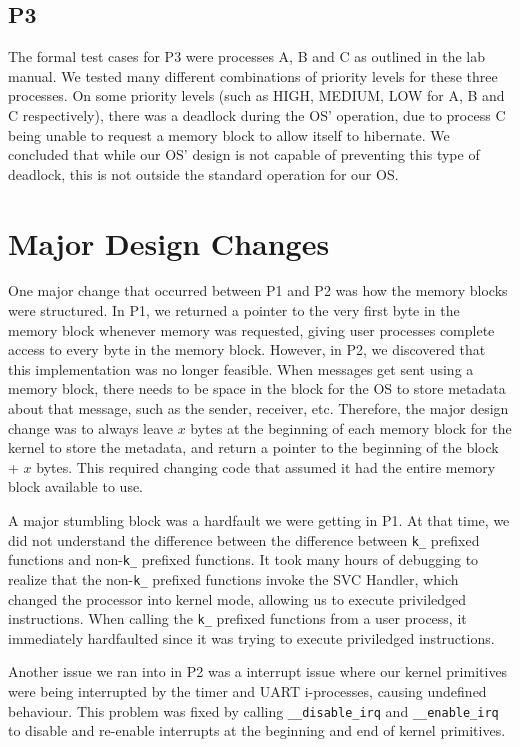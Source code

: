 \documentclass[12pt]{report}
\begin{document}
\subsection{P3}

The formal test cases for P3 were processes A, B and C as outlined in the lab manual.  We tested many different combinations of priority levels for these three processes.  On some priority levels (such as HIGH, MEDIUM, LOW for A, B and C respectively), there was a deadlock during the OS' operation, due to process C being unable to request a memory block to allow itself to hibernate.  We concluded that while our OS' design is not capable of preventing this type of deadlock, this is not outside the standard operation for our OS.

\section{Major Design Changes}

One major change that occurred between P1 and P2 was how the memory blocks were structured. In P1, we returned a pointer to the very first byte in the memory block whenever memory was requested, giving user processes complete access to every byte in the memory block. However, in P2, we discovered that this implementation was no longer feasible. When messages get sent using a memory block, there needs to be space in the block for the OS to store metadata about that message, such as the sender, receiver, etc. Therefore, the major design change was to always leave $x$ bytes at the beginning of each memory block for the kernel to store the metadata, and return a pointer to the beginning of the block + $x$ bytes. This required changing code that assumed it had the entire memory block available to use.

A major stumbling block was a hardfault we were getting in P1. At that time, we did not understand the difference between the difference between \texttt{k_} prefixed functions and non-\texttt{k_} prefixed functions. It took many hours of debugging to realize that the non-\texttt{k_} prefixed functions invoke the SVC Handler, which changed the processor into kernel mode, allowing us to execute priviledged instructions. When calling the \texttt{k_} prefixed functions from a user process, it immediately hardfaulted since it was trying to execute priviledged instructions.

Another issue we ran into in P2 was a interrupt issue where our kernel primitives were being interrupted by the timer and UART i-processes, causing undefined behaviour. This problem was fixed by calling \texttt{__disable_irq} and \texttt{__enable_irq} to disable and re-enable interrupts at the beginning and end of kernel primitives.
\end{document}
